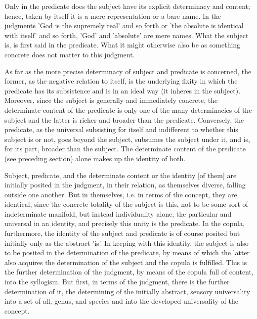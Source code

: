     Only in the predicate does the subject have its
    explicit determinacy and content;
    hence, taken by itself it is a mere representation or a bare name.
    In the judgments 'God is the supremely real' and so forth
    or 'the absolute is identical with itself' and so forth,
    'God' and 'absolute' are mere names.
    What the subject is, is first said in the predicate.
    What it might otherwise also be as something concrete
    does not matter to this judgment.

As far as the more precise determinacy of subject and predicate is concerned,
the former, as the negative relation to itself, is the
underlying fixity in which the predicate has its subsistence
and is in an ideal way (it inheres in the subject).
Moreover, since the subject is generally and immediately concrete,
the determinate content of the predicate is only one of the many
determinacies of the subject and the latter is richer and broader than the predicate.
Conversely, the predicate, as the universal subsisting for itself and
indifferent to whether this subject is or not, goes beyond the subject,
subsumes the subject under it, and is, for its part, broader than the subject.
The determinate content of the predicate (see preceding section)
alone makes up the identity of both.

Subject, predicate, and the determinate content or the identity [of them]
are initially posited in the judgment, in their relation, as themselves diverse,
falling outside one another.
But in themselves, i.e. in terms of the concept, they are identical,
since the concrete totality of the subject is this,
not to be some sort of indeterminate manifold, but instead individuality alone,
the particular and universal in an identity, and precisely this unity is the predicate.
In the copula, furthermore, the identity of the subject and predicate is
of course posited but initially only as the abstract 'is'.
In keeping with this identity, the subject is also to be posited in
the determination of the predicate, by means of which the latter also acquires
the determination of the subject and the copula is fulfilled.
This is the further determination of the judgment,
by means of the copula full of content, into the syllogism.
But first, in terms of the judgment, there is the further determination of it,
the determining of the initially abstract, sensory universality into
a set of all, genus, and species and into the developed universality of the concept.

